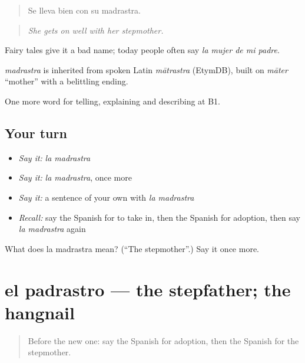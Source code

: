 \begin{quote}
Se lleva bien con su madrastra.
\end{quote}

\begin{quote}
\emph{She gets on well with her stepmother.}
\end{quote}

Fairy tales give it a bad name; today people often say \emph{la mujer de mi padre}.

\begin{cousinweb}
\emph{madrastra} is inherited from spoken Latin \emph{mātrastra} (EtymDB), built on \emph{māter} \textquotedblleft{}mother\textquotedblright{} with a belittling ending.
\end{cousinweb}

\begin{grammarlens}[title={What you've built}]
One more word for telling, explaining and describing at B1.
\end{grammarlens}

\subsection*{Your turn}
\begin{itemize}
\raggedright
  \item \emph{Say it:} \emph{la madrastra}
  \item \emph{Say it:} \emph{la madrastra}, once more
  \item \emph{Say it:} a sentence of your own with \emph{la madrastra}
  \item \emph{Recall:} say the Spanish for to take in, then the Spanish for adoption, then say \emph{la madrastra} again
\end{itemize}

\begin{tcolorbox}[breakable,colback=teal!4,colframe=teal!35!black,title={Before you move on}]
What does la madrastra mean? (\textquotedblleft{}The stepmother\textquotedblright{}.) Say it once more.
\end{tcolorbox}
\section[el padrastro]{el padrastro — the stepfather; the hangnail}

\label{lesson:ES-C748-padrastro}



\begin{quote}
Before the new one: say the Spanish for adoption, then the Spanish for the stepmother.
\end{quote}

